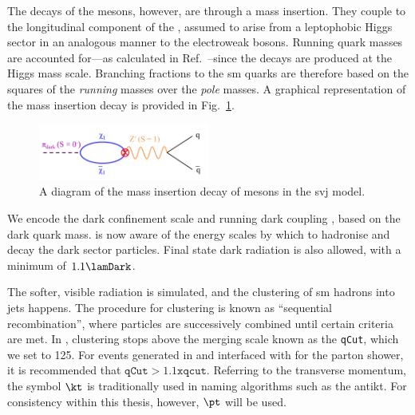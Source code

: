 The decays of the \Ppidark mesons, however, are through a mass insertion. They couple to the longitudinal component of the \PZprime, assumed to arise from a leptophobic Higgs sector in an analogous manner to the electroweak bosons. Running quark masses are accounted for---as calculated in Ref.~--since the decays are produced at the Higgs mass scale. Branching fractions to the \acrshort{sm} quarks are therefore based on the squares of the \emph{running} masses over the \emph{pole} masses. A graphical representation of the mass insertion decay is provided in Fig.~\ref{fig:svj_mass_insertion}.


\begin{figure}[htbp]
    \centering
    \includegraphics[width=0.5\textwidth]{figures/mass_insertion_diagram.pdf}
    \caption[A diagram of the mass insertion decay of \Ppidark mesons in the \schannel semi-visible jet model]{A diagram of the mass insertion decay of \Ppidark mesons in the \schannel \gls{svj} model.}
    \label{fig:svj_mass_insertion}
\end{figure}

We encode the dark confinement scale \lamDark and running dark coupling \aDark, based on the dark quark mass. \PYTHIA is now aware of the energy scales by which to hadronise and decay the dark sector particles. Final state dark radiation is also allowed, with a minimum \pt of $\text{1.1}\lamDark$.


The softer, visible radiation is simulated, and the clustering of \acrshort{sm} hadrons into \glspl{jet} happens. The procedure for clustering is known as ``sequential recombination'', where particles are successively combined until certain criteria are met. In \PYTHIA, clustering stops above the merging scale known as the \texttt{qCut}, which we set to 125\GeV. For events generated in \MADGRAPH and interfaced with \PYTHIA for the parton shower, it is recommended that $\texttt{qCut} > 1.1 \texttt{xqcut}$. Referring to the transverse momentum, the symbol $\kt$ is traditionally used in naming algorithms such as the \gls{antikt}. For consistency within this thesis, however, $\pt$ will be used.

